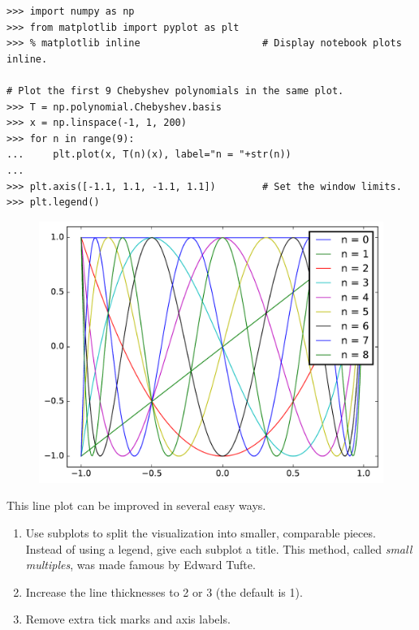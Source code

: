 \begin{lstlisting}
>>> import numpy as np
>>> from matplotlib import pyplot as plt
>>> % matplotlib inline                     # Display notebook plots inline.

# Plot the first 9 Chebyshev polynomials in the same plot.
>>> T = np.polynomial.Chebyshev.basis
>>> x = np.linspace(-1, 1, 200)
>>> for n in range(9):
...     plt.plot(x, T(n)(x), label="n = "+str(n))
...
>>> plt.axis([-1.1, 1.1, -1.1, 1.1])        # Set the window limits.
>>> plt.legend()
\end{lstlisting}

\begin{figure}[H] %
    \centering
    \includegraphics[width=.7\linewidth]{figures/chebyshev_bad.pdf}
\end{figure}

This line plot can be improved in several easy ways.
%
\begin{enumerate}
    \item
    Use subplots to split the visualization into smaller, comparable pieces.
    Instead of using a legend, give each subplot a title.
    This method, called \emph{small multiples}, was made famous by Edward Tufte.
    \item Increase the line thicknesses to 2 or 3 (the default is 1).
    \item Remove extra tick marks and axis labels.
\end{enumerate}

